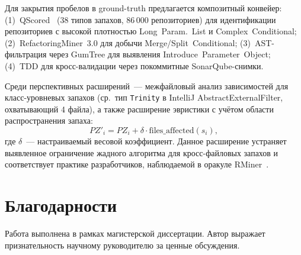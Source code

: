 \documentclass[conference]{IEEEtran}
\begin{document}
Для закрытия пробелов в ground-truth предлагается композитный
конвейер: (1)~QScored~\cite{sharma2021} (38 типов запахов, 86\,000
репозиториев) для идентификации репозиториев с высокой плотностью
Long~Param.~List и Complex~Conditional; (2)~RefactoringMiner~3.0
для добычи Merge/Split~Conditional; (3)~AST-фильтрация через
GumTree для выявления Introduce~Parameter~Object; (4)~TDD для
кросс-валидации через покоммитные SonarQube-снимки.

Среди перспективных расширений~--- межфайловый анализ зависимостей
для класс-уровневых запахов (ср.\ тип \texttt{Trinity} в IntelliJ
AbstractExternalFilter, охватывающий 4 файла), а также расширение
эвристики с учётом области распространения запаха:
\begin{equation}
  PZ'_i = PZ_i + \delta \cdot \mathrm{files\_affected}(s_i),
  \label{eq:pzext}
\end{equation}
где $\delta$~--- настраиваемый весовой коэффициент.
Данное расширение устраняет выявленное ограничение жадного алгоритма
для кросс-файловых запахов и соответствует практике разработчиков,
наблюдаемой в оракуле RMiner~\cite{rminer2022}.

\section*{Благодарности}

Работа выполнена в рамках магистерской диссертации. Автор выражает
признательность научному руководителю за ценные обсуждения.
\end{document}
